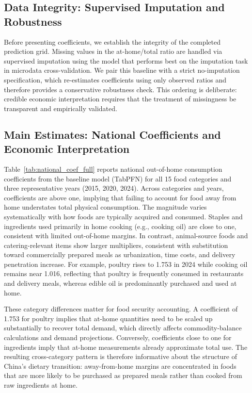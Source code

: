 \documentclass[12pt,a4paper]{article}
\begin{document}
\subsection{Data Integrity: Supervised Imputation and Robustness}

Before presenting coefficients, we establish the integrity of the completed prediction grid. Missing values in the at-home/total ratio are handled via supervised imputation using the model that performs best on the imputation task in microdata cross-validation. We pair this baseline with a strict no-imputation specification, which re-estimates coefficients using only observed ratios and therefore provides a conservative robustness check. This ordering is deliberate: credible economic interpretation requires that the treatment of missingness be transparent and empirically validated.

\subsection{Main Estimates: National Coefficients and Economic Interpretation}

Table~\ref{tab:national_coef_full} reports national out-of-home consumption coefficients from the baseline model (TabPFN) for all 15 food categories and three representative years (2015, 2020, 2024). Across categories and years, coefficients are above one, implying that failing to account for food away from home understates total physical consumption. The magnitude varies systematically with how foods are typically acquired and consumed. Staples and ingredients used primarily in home cooking (e.g., cooking oil) are close to one, consistent with limited out-of-home margins. In contrast, animal-source foods and catering-relevant items show larger multipliers, consistent with substitution toward commercially prepared meals as urbanization, time costs, and delivery penetration increase. For example, poultry rises to 1.753 in 2024 while cooking oil remains near 1.016, reflecting that poultry is frequently consumed in restaurants and delivery meals, whereas edible oil is predominantly purchased and used at home.

These category differences matter for food security accounting. A coefficient of 1.753 for poultry implies that at-home quantities need to be scaled up substantially to recover total demand, which directly affects commodity-balance calculations and demand projections. Conversely, coefficients close to one for ingredients imply that at-home measurements already approximate total use. The resulting cross-category pattern is therefore informative about the structure of China’s dietary transition: away-from-home margins are concentrated in foods that are more likely to be purchased as prepared meals rather than cooked from raw ingredients at home.
\end{document}
